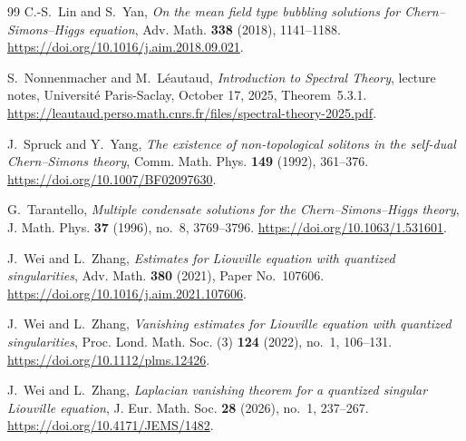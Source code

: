 \documentclass[11pt,reqno]{amsart}
\numberwithin{equation}{section}
\theoremstyle{definition}
\theoremstyle{remark}
\begin{document}
\begin{thebibliography}{99}
C.-S.~Lin and S.~Yan,
\emph{On the mean field type bubbling solutions for Chern--Simons--Higgs equation},
Adv. Math. \textbf{338} (2018), 1141--1188.
\url{https://doi.org/10.1016/j.aim.2018.09.021}.

S.~Nonnenmacher and M.~L\'eautaud,
\emph{Introduction to Spectral Theory},
lecture notes, Universit\'e Paris-Saclay, October 17, 2025,
Theorem~5.3.1.
\url{https://leautaud.perso.math.cnrs.fr/files/spectral-theory-2025.pdf}.

J.~Spruck and Y.~Yang,
\emph{The existence of non-topological solitons in the self-dual
Chern--Simons theory},
Comm. Math. Phys. \textbf{149} (1992), 361--376.
\url{https://doi.org/10.1007/BF02097630}.

G.~Tarantello,
\emph{Multiple condensate solutions for the Chern--Simons--Higgs theory},
J. Math. Phys. \textbf{37} (1996), no.~8, 3769--3796.
\url{https://doi.org/10.1063/1.531601}.

J.~Wei and L.~Zhang,
\emph{Estimates for Liouville equation with quantized singularities},
Adv. Math. \textbf{380} (2021), Paper No.~107606.
\url{https://doi.org/10.1016/j.aim.2021.107606}.

J.~Wei and L.~Zhang,
\emph{Vanishing estimates for Liouville equation with quantized
singularities},
Proc. Lond. Math. Soc. (3) \textbf{124} (2022), no.~1, 106--131.
\url{https://doi.org/10.1112/plms.12426}.

J.~Wei and L.~Zhang,
\emph{Laplacian vanishing theorem for a quantized singular Liouville
equation},
J. Eur. Math. Soc. \textbf{28} (2026), no.~1, 237--267.
\url{https://doi.org/10.4171/JEMS/1482}.

\end{thebibliography}
\end{document}
